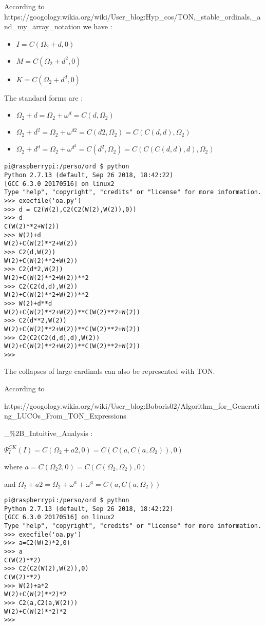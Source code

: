 \documentclass[10pt]{article}
\begin{document}
According to  https://googology.wikia.org/wiki/User\_blog:Hyp\_cos/TON,\_stable\_ordinals,\_and\_my\_array\_notation we have :

\begin{itemize}
 \item $I = C(\Omega_2+d,0)$
 \item $M = C(\Omega_2+d^2,0)$
 \item $K = C(\Omega_2+d^d,0)$
\end{itemize}

The standard forms are :

\begin{itemize}
 \item $\Omega_2 + d = \Omega_2 + \omega^d = C(d,\Omega_2)$
 \item $\Omega_2 + d^2 = \Omega_2 + \omega^{d 2} = C(d 2,\Omega_2) = C(C(d,d),\Omega_2)$
 \item $\Omega_2 + d^d = \Omega_2 + \omega^{d^2} = C(d^2,\Omega_2) = C(C(C(d,d),d),\Omega_2)$
\end{itemize}

\begin{verbatim}
pi@raspberrypi:/perso/ord $ python
Python 2.7.13 (default, Sep 26 2018, 18:42:22)
[GCC 6.3.0 20170516] on linux2
Type "help", "copyright", "credits" or "license" for more information.
>>> execfile('oa.py')
>>> d = C2(W(2),C2(C2(W(2),W(2)),0))
>>> d
C(W(2)**2+W(2))
>>> W(2)+d
W(2)+C(W(2)**2+W(2))
>>> C2(d,W(2))
W(2)+C(W(2)**2+W(2))
>>> C2(d*2,W(2))
W(2)+C(W(2)**2+W(2))**2
>>> C2(C2(d,d),W(2))
W(2)+C(W(2)**2+W(2))**2
>>> W(2)+d**d
W(2)+C(W(2)**2+W(2))**C(W(2)**2+W(2))
>>> C2(d**2,W(2))
W(2)+C(W(2)**2+W(2))**C(W(2)**2+W(2))
>>> C2(C2(C2(d,d),d),W(2))
W(2)+C(W(2)**2+W(2))**C(W(2)**2+W(2))
>>>
\end{verbatim}

The collapses of large cardinals can also be represented with TON.

According to  

https://googology.wikia.org/wiki/User\_blog:Boboris02/Algorithm\_for\_Generating\_LUCOs\_From\_TON\_Expressions

\_\%2B\_Intuitive\_Analysis :

$\Psi^{CK}_I(I) = C(\Omega_2+a 2, 0) = C(C(a,C(a,\Omega_2)),0)$

where $a = C(\Omega_2 2, 0) = C(C(\Omega_2,\Omega_2),0)$

and $\Omega_2+a 2 = \Omega_2+\omega^a+\omega^a = C(a,C(a,\Omega_2))$

\begin{verbatim}
pi@raspberrypi:/perso/ord $ python
Python 2.7.13 (default, Sep 26 2018, 18:42:22)
[GCC 6.3.0 20170516] on linux2
Type "help", "copyright", "credits" or "license" for more information.
>>> execfile('oa.py')
>>> a=C2(W(2)*2,0)
>>> a
C(W(2)**2)
>>> C2(C2(W(2),W(2)),0)
C(W(2)**2)
>>> W(2)+a*2
W(2)+C(W(2)**2)*2
>>> C2(a,C2(a,W(2)))
W(2)+C(W(2)**2)*2
>>>
\end{verbatim}
\end{document}
